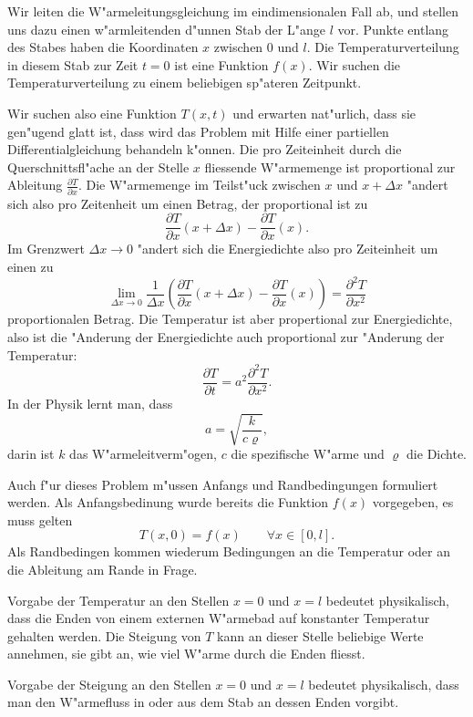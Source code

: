 Wir leiten die W"armeleitungsgleichung im eindimensionalen Fall ab, und stellen
uns dazu einen w"armleitenden d"unnen Stab der L"ange $l$ vor. Punkte
entlang des Stabes haben die Koordinaten $x$ zwischen $0$ und $l$.
Die Temperaturverteilung in diesem Stab zur Zeit $t=0$ ist eine Funktion
$f(x)$. Wir suchen die Temperaturverteilung zu einem beliebigen sp"ateren Zeitpunkt.

Wir suchen also eine Funktion $T(x,t)$ und erwarten nat"urlich, dass sie
gen"ugend glatt ist, dass wird das Problem mit Hilfe einer partiellen
Differentialgleichung behandeln k"onnen. Die pro Zeiteinheit
durch die Querschnittsfl"ache an der Stelle $x$ fliessende W"armemenge ist
proportional zur Ableitung $\frac{\partial T}{\partial x}$.
Die W"armemenge im Teilst"uck zwischen $x$ und $x+\Delta x$ "andert sich also
pro Zeitenheit um einen Betrag, der proportional ist zu
\[
\frac{\partial T}{\partial x}(x+\Delta x)-\frac{\partial T}{\partial x}(x).
\]
Im Grenzwert $\Delta x\to 0$
"andert sich die Energiedichte also pro Zeiteinheit um einen zu
\[
\lim_{\Delta x\to 0}\frac1{\Delta x}\left(\frac{\partial T}{\partial x}(x+\Delta x)-\frac{\partial T}{\partial x}(x)\right)
=\frac{\partial^2T}{\partial x^2}
\]
proportionalen Betrag.
Die Temperatur ist aber propertional zur Energiedichte, also ist die "Anderung
der Energiedichte auch proportional zur "Anderung der Temperatur:
\[
\frac{\partial T}{\partial t}=a^2\frac{\partial^2T}{\partial x^2}.
\]
In der Physik lernt man, dass
\[
a=\sqrt{\frac{k}{c\varrho}},
\]
darin ist $k$ das W"armeleitverm"ogen, $c$ die spezifische W"arme
und $\varrho$ die Dichte.

Auch f"ur dieses Problem m"ussen Anfangs und Randbedingungen formuliert werden.
Als Anfangsbedinung wurde bereits die Funktion $f(x)$ vorgegeben, es muss
gelten
\[
T(x,0)=f(x)\qquad \forall x\in[0,l].
\]
Als Randbedingen kommen wiederum Bedingungen an die Temperatur oder an die
Ableitung am Rande in Frage.

Vorgabe der Temperatur an den Stellen $x=0$ und $x=l$ bedeutet physikalisch, dass
die Enden von einem externen W"armebad auf konstanter Temperatur gehalten
werden. Die Steigung von $T$ kann an dieser Stelle beliebige Werte annehmen,
sie gibt an, wie viel W"arme durch die Enden fliesst.

Vorgabe der Steigung an den Stellen $x=0$ und $x=l$ bedeutet physikalisch,
dass man den W"armefluss in oder aus dem Stab an dessen Enden vorgibt.

